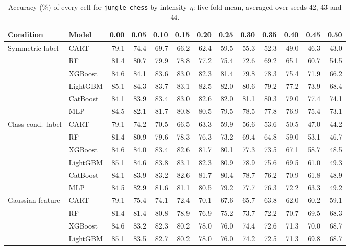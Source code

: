 \documentclass[pdflatex,sn-mathphys]{sn-jnl}
\theoremstyle{thmstyleone}
\begin{document}
\begin{table}[htbp]
\centering
\tiny
\setlength{\tabcolsep}{2.6pt}
\caption{Accuracy (\%) of every cell for \texttt{jungle\_chess} by intensity $\eta$: five-fold mean, averaged over seeds 42, 43 and 44.}
\label{tab:grid_jungle_chess}
\begin{tabular}{@{}llrrrrrrrrrrr@{}}
\toprule
Condition & Model & 0.00 & 0.05 & 0.10 & 0.15 & 0.20 & 0.25 & 0.30 & 0.35 & 0.40 & 0.45 & 0.50 \\
\midrule
Symmetric label & CART & 79.1 & 74.4 & 69.7 & 66.2 & 62.4 & 59.5 & 55.3 & 52.3 & 49.0 & 46.3 & 43.0 \\
 & RF & 81.4 & 80.7 & 79.9 & 78.8 & 77.2 & 75.4 & 72.6 & 69.2 & 65.1 & 60.7 & 54.5 \\
 & XGBoost & 84.6 & 84.1 & 83.6 & 83.0 & 82.3 & 81.4 & 79.8 & 78.3 & 75.4 & 71.9 & 66.2 \\
 & LightGBM & 85.1 & 84.3 & 83.7 & 83.1 & 82.5 & 82.0 & 80.6 & 79.2 & 77.2 & 73.9 & 68.4 \\
 & CatBoost & 84.1 & 83.9 & 83.4 & 83.0 & 82.6 & 82.0 & 81.1 & 80.3 & 79.0 & 77.4 & 74.1 \\
 & MLP & 84.5 & 82.1 & 81.7 & 80.8 & 80.5 & 79.5 & 78.5 & 77.8 & 76.9 & 75.4 & 73.1 \\
\midrule
Class-cond.\ label & CART & 79.1 & 74.2 & 70.5 & 66.5 & 63.3 & 59.9 & 56.6 & 53.6 & 50.5 & 47.0 & 44.2 \\
 & RF & 81.4 & 80.9 & 79.6 & 78.3 & 76.3 & 73.2 & 69.4 & 64.8 & 59.0 & 53.1 & 46.7 \\
 & XGBoost & 84.6 & 84.0 & 83.4 & 82.6 & 81.7 & 80.1 & 77.3 & 73.5 & 67.1 & 58.7 & 48.5 \\
 & LightGBM & 85.1 & 84.6 & 83.8 & 83.1 & 82.3 & 80.9 & 78.9 & 75.6 & 69.5 & 61.0 & 49.3 \\
 & CatBoost & 84.1 & 83.9 & 83.2 & 82.6 & 81.7 & 80.4 & 78.7 & 76.2 & 70.9 & 61.8 & 48.9 \\
 & MLP & 84.5 & 82.9 & 81.6 & 81.1 & 80.5 & 79.2 & 77.7 & 76.3 & 72.2 & 63.3 & 49.2 \\
\midrule
Gaussian feature & CART & 79.1 & 75.4 & 74.1 & 72.4 & 70.1 & 67.6 & 65.7 & 63.8 & 62.0 & 60.2 & 59.1 \\
 & RF & 81.4 & 81.4 & 80.8 & 78.9 & 76.9 & 75.2 & 73.7 & 72.2 & 70.7 & 69.5 & 68.3 \\
 & XGBoost & 84.6 & 83.2 & 82.3 & 80.2 & 78.0 & 76.0 & 74.4 & 72.6 & 71.3 & 70.0 & 68.7 \\
 & LightGBM & 85.1 & 83.5 & 82.7 & 80.2 & 78.0 & 76.0 & 74.2 & 72.5 & 71.3 & 69.8 & 68.7 \\

\end{tabular}
\end{table}
\end{document}
